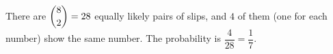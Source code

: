 There are $\dbinom82=28$ equally likely pairs of slips, and $4$ of them (one for each number) show the same number. The probability is $\dfrac4{28}=\boxed{\dfrac17}$.
